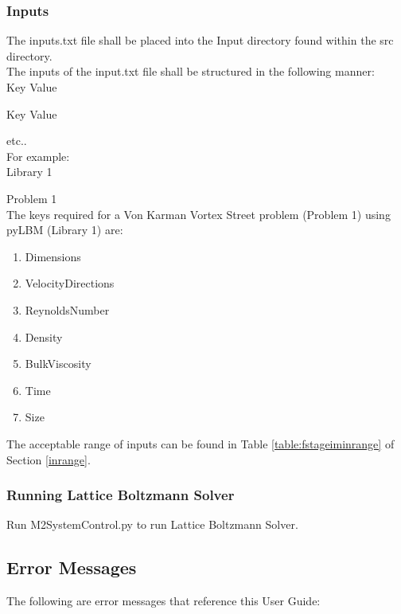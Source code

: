 \documentclass[12pt, titlepage]{article}
\newcommand{\myprogname}{Lattice Boltzmann Solver}
\begin{document}
\subsubsection{Inputs}
\label{inputs}
The inputs.txt file shall be placed into the Input directory found within the src directory.\\


\noindent The inputs of the input.txt file shall be structured in the following manner:\\ 

Key Value

Key Value

etc..\\

For example:\\

Library 1

Problem 1\\

\noindent The keys required for a Von Karman Vortex Street problem (Problem 1) using pyLBM (Library 1) are:
\begin{enumerate}
	\item Dimensions
	\item VelocityDirections
	\item ReynoldsNumber
	\item Density
	\item BulkViscosity
	\item Time
	\item Size
\end{enumerate}


\noindent The acceptable range of inputs can be found in Table \ref{table:fstageiminrange} of Section \ref{inrange}. 

\subsubsection{Running {\myprogname}}

Run M2SystemControl.py to run {\myprogname}.

\subsection{Error Messages}

The following are error messages that reference this User Guide:
\end{document}
